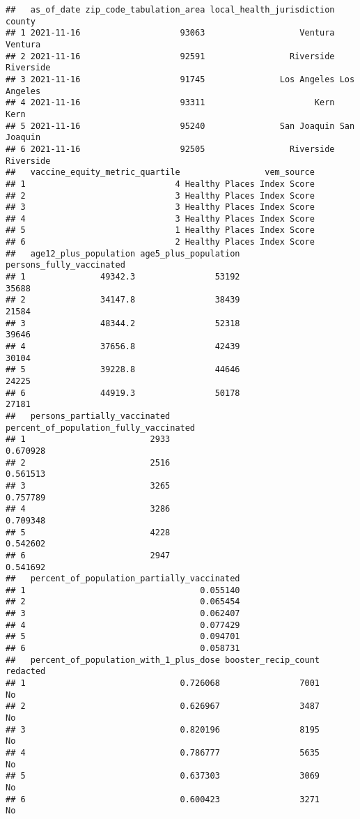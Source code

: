 \documentclass[
]{article}
\begin{document}
\begin{verbatim}
##   as_of_date zip_code_tabulation_area local_health_jurisdiction      county
## 1 2021-11-16                    93063                   Ventura     Ventura
## 2 2021-11-16                    92591                 Riverside   Riverside
## 3 2021-11-16                    91745               Los Angeles Los Angeles
## 4 2021-11-16                    93311                      Kern        Kern
## 5 2021-11-16                    95240               San Joaquin San Joaquin
## 6 2021-11-16                    92505                 Riverside   Riverside
##   vaccine_equity_metric_quartile                 vem_source
## 1                              4 Healthy Places Index Score
## 2                              3 Healthy Places Index Score
## 3                              3 Healthy Places Index Score
## 4                              3 Healthy Places Index Score
## 5                              1 Healthy Places Index Score
## 6                              2 Healthy Places Index Score
##   age12_plus_population age5_plus_population persons_fully_vaccinated
## 1               49342.3                53192                    35688
## 2               34147.8                38439                    21584
## 3               48344.2                52318                    39646
## 4               37656.8                42439                    30104
## 5               39228.8                44646                    24225
## 6               44919.3                50178                    27181
##   persons_partially_vaccinated percent_of_population_fully_vaccinated
## 1                         2933                               0.670928
## 2                         2516                               0.561513
## 3                         3265                               0.757789
## 4                         3286                               0.709348
## 5                         4228                               0.542602
## 6                         2947                               0.541692
##   percent_of_population_partially_vaccinated
## 1                                   0.055140
## 2                                   0.065454
## 3                                   0.062407
## 4                                   0.077429
## 5                                   0.094701
## 6                                   0.058731
##   percent_of_population_with_1_plus_dose booster_recip_count redacted
## 1                               0.726068                7001       No
## 2                               0.626967                3487       No
## 3                               0.820196                8195       No
## 4                               0.786777                5635       No
## 5                               0.637303                3069       No
## 6                               0.600423                3271       No
\end{verbatim}
\end{document}
